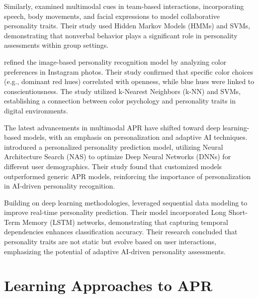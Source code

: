 Similarly, \citet{Batrinca2016} examined multimodal cues in team-based interactions, incorporating speech, body movements, and facial expressions to model collaborative personality traits. Their study used Hidden Markov Models (HMMs) and SVMs, demonstrating that nonverbal behavior plays a significant role in personality assessments within group settings.

\citet{Branz2020} refined the image-based personality recognition model by analyzing color preferences in Instagram photos. Their study confirmed that specific color choices (e.g., dominant red hues) correlated with openness, while blue hues were linked to conscientiousness. The study utilized k-Nearest Neighbors (k-NN) and SVMs, establishing a connection between color psychology and personality traits in digital environments.

The latest advancements in multimodal APR have shifted toward deep learning-based models, with an emphasis on personalization and adaptive AI techniques. \citet{Salam2022} introduced a personalized personality prediction model, utilizing Neural Architecture Search (NAS) to optimize Deep Neural Networks (DNNs) for different user demographics. Their study found that customized models outperformed generic APR models, reinforcing the importance of personalization in AI-driven personality recognition.

Building on deep learning methodologies, \citet{Lima2022} leveraged sequential data modeling to improve real-time personality prediction. Their model incorporated Long Short-Term Memory (LSTM) networks, demonstrating that capturing temporal dependencies enhances classification accuracy. Their research concluded that personality traits are not static but evolve based on user interactions, emphasizing the potential of adaptive AI-driven personality assessments.

\section{Learning Approaches to APR}
\label{sec: LearningApproaches}

